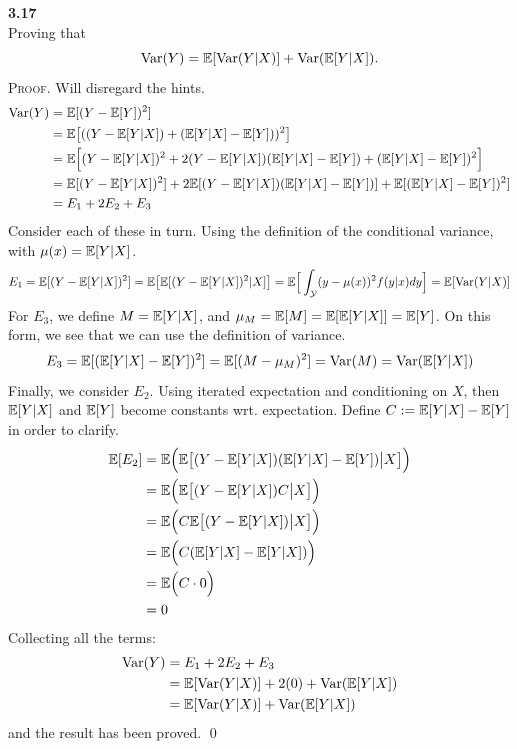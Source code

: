 \newpage\noindent
\textbf{3.17}\\  %
Proving that
$$
\text{Var}(Y) = \mathbb{E}[\text{Var}(Y|X)] + \text{Var}(\mathbb{E}[Y|X]).
$$
\textsc{Proof}. Will disregard the hints.
\begin{align*}
    \text{Var}(Y) &= \mathbb{E}[(Y - \mathbb{E}[Y])^2] \\
    &= \mathbb{E}\big[((Y - \mathbb{E}[Y|X]) + (\mathbb{E}[Y|X]- \mathbb{E}[Y]))^2\big] \\
    &= \mathbb{E}\Big[(Y - \mathbb{E}[Y|X])^2 + 2(Y - \mathbb{E}[Y|X])(\mathbb{E}[Y|X] - \mathbb{E}[Y]) + (\mathbb{E}[Y|X] - \mathbb{E}[Y])^2\Big] \\
    &= \mathbb{E}[(Y - \mathbb{E}[Y|X])^2] + 2\mathbb{E}[(Y - \mathbb{E}[Y|X])(\mathbb{E}[Y|X] - \mathbb{E}[Y])] + \mathbb{E}[(\mathbb{E}[Y|X] - \mathbb{E}[Y])^2] \\
    &= E_1 + 2E_2 + E_3
\end{align*}
Consider each of these in turn. Using the definition of the conditional variance,
with $\mu(x) = \mathbb{E}[Y|X]$.
$$
E_1 = \mathbb{E}[(Y - \mathbb{E}[Y|X])^2] = \mathbb{E}\big[\mathbb{E}[(Y - \mathbb{E}[Y|X])^2|X]\big]
= \mathbb{E}\Big[\int_{\mathcal{Y}}(y - \mu(x))^2f(y|x)dy\Big] = \mathbb{E}[\text{Var}(Y|X)]
$$
For $E_3$, we define $M = \mathbb{E}[Y|X]$, and $\mu_M = \mathbb{E}[M] = \mathbb{E}[\mathbb{E}[Y|X]] = \mathbb{E}[Y]$.
On this form, we see that we can use the definition of variance.
$$
E_3 = \mathbb{E}[(\mathbb{E}[Y|X] - \mathbb{E}[Y])^2] = \mathbb{E}[(M - \mu_M)^2] = \text{Var}(M) = \text{Var}(\mathbb{E}[Y|X])
$$
Finally, we consider $E_2$. Using iterated expectation and conditioning on $X$,
then $\mathbb{E}[Y|X]$ and $\mathbb{E}[Y]$ become constants wrt. expectation. Define
$C := \mathbb{E}[Y|X] - \mathbb{E}[Y]$ in order to clarify.
\begin{align*}
    \mathbb{E}[E_2] &= \mathbb{E}\Big(\mathbb{E}\big[ (Y - \mathbb{E}[Y|X])(\mathbb{E}[Y|X] - \mathbb{E}[Y]) \big|X\big]\Big) \\
    &= \mathbb{E}\Big(\mathbb{E}\big[ (Y - \mathbb{E}[Y|X])C \big|X\big]\Big) \\
    &= \mathbb{E}\Big(C\mathbb{E}\big[ (Y - \mathbb{E}[Y|X]) \big|X\big]\Big) \\
    &= \mathbb{E}\Big(C(\mathbb{E}[Y|X] - \mathbb{E}[Y|X])\Big) \\
    &= \mathbb{E}\Big(C\cdot0\Big) \\
    &= 0
\end{align*}
Collecting all the terms:
\begin{align*}
    \text{Var}(Y) &= E_1 + 2E_2 + E_3 \\
    &= \mathbb{E}[\text{Var}(Y|X)] + 2(0) + \text{Var}(\mathbb{E}[Y|X])\\
    &= \mathbb{E}[\text{Var}(Y|X)] + \text{Var}(\mathbb{E}[Y|X])
\end{align*}
and the result has been proved. \qed

